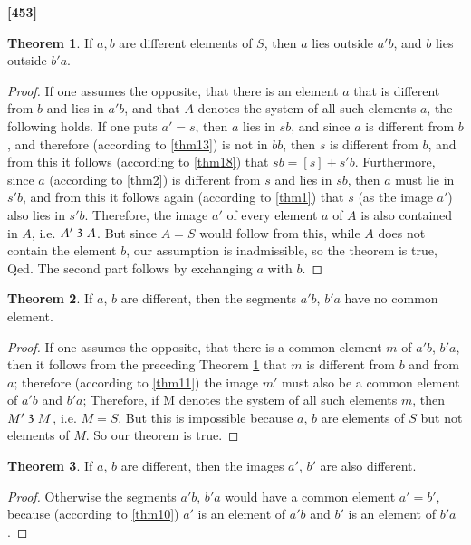 \documentclass[leqno]{article}
\theoremstyle{definition}
\newtheorem{theorem}{Theorem}
\newcommand\partof{\mathrel{\raisebox{0.45ex}{$\mathfrak{3}$}}}
\begin{document}
\noindent \textbf{[453]}

\begin{theorem}\label{thm19}
If $a, b$ are different elements of $S$, then $a$ lies outside $a'b$, and $b$ lies outside $b'a$.\end{theorem}

\begin{proof}
If one assumes the opposite, that there is an element $a$ that is different from $b$ and lies in $a'b$, and that $A$ denotes the system of all such elements $a$, the following holds. 
If one puts $a'=s$, then $a$ lies in $sb$, and since $a$ is different from $b$, and therefore (according to \ref{thm13}) is not in $bb$, then $s$ is different from $b$, and from this it follows (according to \ref{thm18}) that $sb = [s] + s 'b$. 
Furthermore, since $a$ (according to \ref{thm2}) is different from $s$ and lies in $sb$, then $a$ must lie in $s'b$, and from this it follows again (according to \ref{thm1}) that $s$ (as the image $a'$) also lies in $s'b$. 
Therefore, the image $a'$ of every element $a$ of $A$ is also contained in $A$, i.e. $A' \partof A$. 
But since $A=S$ would follow from this, while $A$ does not contain the element $b$, our assumption is inadmissible, so the theorem is true, Qed. 
The second part follows by exchanging $a$ with $b$.\end{proof}

\begin{theorem}\label{thm20}
If $a$, $b$ are different, then the segments $a'b$, $b'a$ have no common element.
\end{theorem}

\begin{proof}	
If one assumes the opposite, that there is a common element $m$ of $a'b$, $b'a$, then it follows from the preceding Theorem \ref{thm19} that $m$ is different from $b$ and from $a$; therefore (according to \ref{thm11}) the image $m'$ must also be a common element of $a'b$ and $b'a$; 
Therefore, if M denotes the system of all such elements $m$, then $M' \partof M$, i.e. $M=S$. But this is impossible because $a$, $b$ are elements of $S$ but not elements of $M$. So our theorem is true.
\end{proof}	

\begin{theorem}\label{thm21}
If $a$, $b$ are different, then the images $a'$, $b'$ are also different.
\end{theorem}

\begin{proof}
Otherwise the segments $a'b$, $b'a$ would have a common element $a'=b'$, because (according to \ref{thm10}) $a'$ is an element of $a'b$ and $b'$ is an element of $b'a$.
\end{proof}
\end{document}
